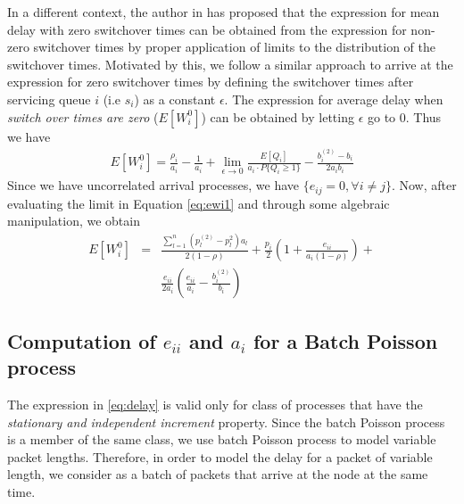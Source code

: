 \documentclass[10pt, conference, compsocconf]{IEEEtran}
\begin{document}
In a different context, the author in \cite{levy} has proposed that the expression for mean delay with zero switchover times can be obtained from the expression for non-zero switchover times by proper application of limits to the distribution of the switchover times. Motivated by this, we follow a similar approach to arrive at the expression for zero switchover times by defining the switchover times after servicing queue $i$ (i.e $s_i$) as a constant $\epsilon$. The expression for average delay when \emph{switch over times are zero} ($E[W^0_i]$) can be obtained by letting $\epsilon$ go to $0$. Thus we have 
\begin{eqnarray} \label{eq:ewi1}
E[W^0_i] =   \frac{\rho_i}{a_i}  - \frac{1}{a_i} + \lim_{\epsilon \to 0} \frac{E[Q_i]}{a_i \cdot P\{Q_i \geq 1 \}}-\frac{b^{(2)}_{i}-b_{i}}{2a_ib_{i}}
\end{eqnarray}
Since we have uncorrelated arrival processes, we have $\{e_{ij}=0, \forall i \neq j\}$. Now, after evaluating the limit in Equation \eqref{eq:ewi1} and through some algebraic manipulation, we obtain
\begin{eqnarray} \label{eq:delay}
E[W^0_i] &=&  \frac{\sum^n_{l=1} (p^{(2)}_l - p^2_l) a_l}{2(1-\rho)} + \frac{p_i}{2}\left(1 + \frac{e_{ii}}{a_i(1-\rho)} \right) \nonumber + \\
&& \frac{e_{ii}}{2a_i} \left( \frac{e_{ii}}{a_i} - \frac{b^{(2)}_i}{b_i}\right)
\end{eqnarray}

\subsection{Computation of $e_{ii}$ and $a_i$ for a Batch Poisson process}
The expression in \eqref{eq:delay} is valid only for class of processes that have the \emph{stationary and independent increment} property. Since the batch Poisson process is a member of the same class, we use batch Poisson process to model variable packet lengths. Therefore, in order to model the delay for a packet of variable length, we consider as a batch of packets that arrive at the node at the same time. 
\end{document}
